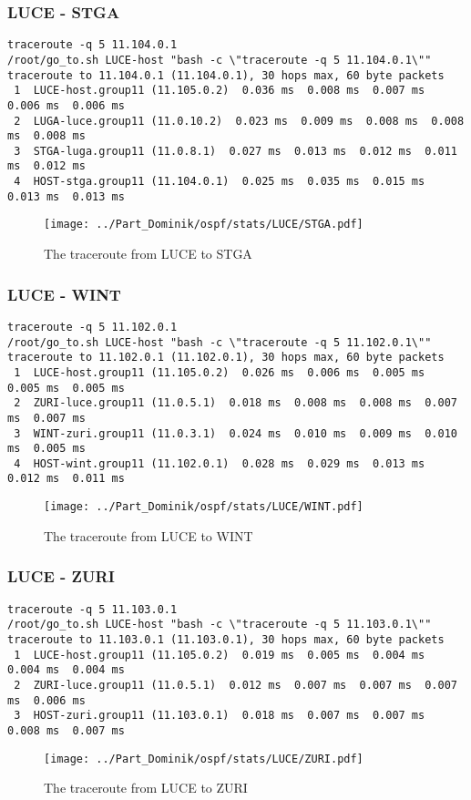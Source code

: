 \subsubsection{LUCE - STGA}
\begin{lstlisting}
traceroute -q 5 11.104.0.1
/root/go_to.sh LUCE-host "bash -c \"traceroute -q 5 11.104.0.1\""
traceroute to 11.104.0.1 (11.104.0.1), 30 hops max, 60 byte packets
 1  LUCE-host.group11 (11.105.0.2)  0.036 ms  0.008 ms  0.007 ms  0.006 ms  0.006 ms
 2  LUGA-luce.group11 (11.0.10.2)  0.023 ms  0.009 ms  0.008 ms  0.008 ms  0.008 ms
 3  STGA-luga.group11 (11.0.8.1)  0.027 ms  0.013 ms  0.012 ms  0.011 ms  0.012 ms
 4  HOST-stga.group11 (11.104.0.1)  0.025 ms  0.035 ms  0.015 ms  0.013 ms  0.013 ms
\end{lstlisting}
\begin{figure}[H]
\centering
\texttt{[image: ../Part\_Dominik/ospf/stats/LUCE/STGA.pdf]}
\caption{The traceroute from LUCE to STGA}
\end{figure}
\clearpage
\subsubsection{LUCE - WINT}
\begin{lstlisting}
traceroute -q 5 11.102.0.1
/root/go_to.sh LUCE-host "bash -c \"traceroute -q 5 11.102.0.1\""
traceroute to 11.102.0.1 (11.102.0.1), 30 hops max, 60 byte packets
 1  LUCE-host.group11 (11.105.0.2)  0.026 ms  0.006 ms  0.005 ms  0.005 ms  0.005 ms
 2  ZURI-luce.group11 (11.0.5.1)  0.018 ms  0.008 ms  0.008 ms  0.007 ms  0.007 ms
 3  WINT-zuri.group11 (11.0.3.1)  0.024 ms  0.010 ms  0.009 ms  0.010 ms  0.005 ms
 4  HOST-wint.group11 (11.102.0.1)  0.028 ms  0.029 ms  0.013 ms  0.012 ms  0.011 ms
\end{lstlisting}
\begin{figure}[H]
\centering
\texttt{[image: ../Part\_Dominik/ospf/stats/LUCE/WINT.pdf]}
\caption{The traceroute from LUCE to WINT}
\end{figure}
\clearpage
\subsubsection{LUCE - ZURI}
\begin{lstlisting}
traceroute -q 5 11.103.0.1
/root/go_to.sh LUCE-host "bash -c \"traceroute -q 5 11.103.0.1\""
traceroute to 11.103.0.1 (11.103.0.1), 30 hops max, 60 byte packets
 1  LUCE-host.group11 (11.105.0.2)  0.019 ms  0.005 ms  0.004 ms  0.004 ms  0.004 ms
 2  ZURI-luce.group11 (11.0.5.1)  0.012 ms  0.007 ms  0.007 ms  0.007 ms  0.006 ms
 3  HOST-zuri.group11 (11.103.0.1)  0.018 ms  0.007 ms  0.007 ms  0.008 ms  0.007 ms
\end{lstlisting}
\begin{figure}[H]
\centering
\texttt{[image: ../Part\_Dominik/ospf/stats/LUCE/ZURI.pdf]}
\caption{The traceroute from LUCE to ZURI}
\end{figure}
\clearpage

